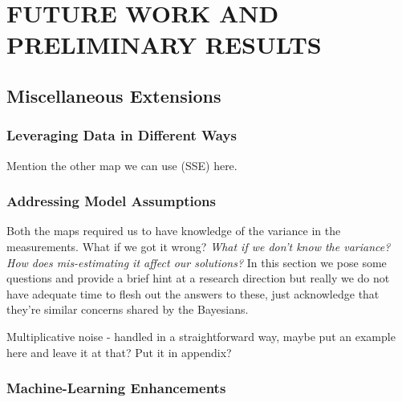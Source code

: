\chapter{\uppercase{Future Work and Preliminary Results} \label{chapter:future}}



\FloatBarrier

%
%
%

\section{Miscellaneous Extensions}


\subsection{Leveraging Data in Different Ways}\label{sec:ch05-data}
Mention the other map we can use (SSE) here.

\subsection{Addressing Model Assumptions}\label{sec:ch05-variance}
Both the maps required us to have knowledge of the variance in the measurements.
What if we got it wrong?
\emph{What if we don't know the variance? How does mis-estimating it affect our solutions?}
In this section we pose some questions and provide a brief hint at a research direction but really we do not have adequate time to flesh out the answers to these, just acknowledge that they're similar concerns shared by the Bayesians.

Multiplicative noise - handled in a straightforward way, maybe put an example here and leave it at that? Put it in appendix?


\subsection{Machine-Learning Enhancements}\label{sec:ch05-ml}

